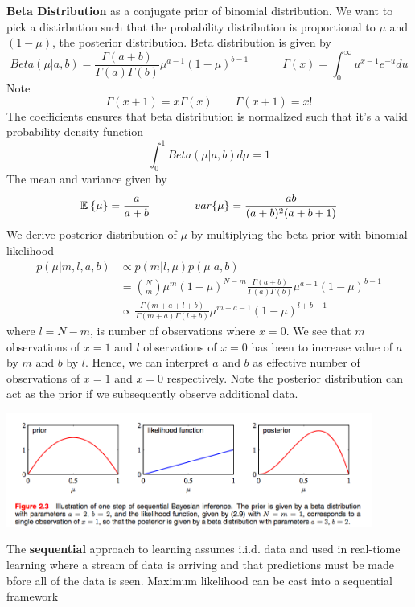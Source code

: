 \documentclass[11pt]{article}
\begin{document}
\begin{defn*}
    \textbf{Beta Distribution} as a conjugate prior of binomial distribution. We want to pick a distirbution such that the probability distribution is proportional to $\mu$ and $(1-\mu)$, the posterior distribution. Beta distribution is given by 
    \[
        Beta(\mu | a,b) = \frac{\Gamma(a+b)}{\Gamma(a)\Gamma(b)} \mu^{a-1}(1-\mu)^{b-1}
        \quad \quad \quad 
        \Gamma(x) = \int_0^{\infty} u^{x-1} e^{-u} du
    \]
    Note 
    \[
        \Gamma(x+1)=x\Gamma(x) \quad \quad \Gamma(x+1) = x!    
    \]
    The coefficients ensures that beta distribution is normalized such that it's a valid probability density function
    \[
        \int^1_0 Beta(\mu |a,b) d\mu = 1    
    \]
    The mean and variance given by 
    \[
        \mathbb{E}_{}\left\{\mu\right\} = \frac{a}{a+b}
        \quad \quad \quad \quad 
        var\{\mu\} = \frac{ab}{(a+b)^2(a+b+1)}
    \]
    We derive posterior distribution of $\mu$ by multiplying the beta prior with binomial likelihood 
    \begin{align*}
        p(\mu | m,l,a,b) 
        &\propto p(m|l,\mu)p(\mu|a,b) \\ 
        &=
        \binom{N}{m} \mu^m (1-\mu)^{N-m} \frac{\Gamma(a+b)}{\Gamma(a)\Gamma(b)} \mu^{a-1}(1-\mu)^{b-1} \\
        &\propto \frac{\Gamma(m+a+l+b)}{\Gamma(m+a)\Gamma(l+b)} \mu^{m+a-1} (1-\mu)^{l+b-1}
    \end{align*}
    where $l=N-m$, is number of observations where $x=0$. We see that $m$ observations of $x=1$ and $l$ observations of $x=0$ has been to increase value of $a$ by $m$ and $b$ by $l$. Hence, we can interpret $a$ and $b$ as effective number of observations of $x=1$ and $x=0$ respectively. Note the posterior distribution can act as the prior if we subsequently observe additional data.  \\
    \begin{center}
        \includegraphics[width=12cm]{prior_to_posterior.jpg}
    \end{center}  
    The \textbf{sequential} approach to learning assumes i.i.d. data and used in real-tiome learning where a stream of data is arriving and that predictions must be made bfore all of the data is seen. Maximum likelihood can be cast into a sequential framework
\end{defn*}
\end{document}

